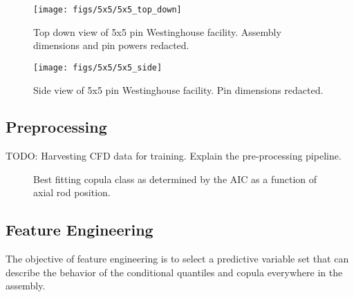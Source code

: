\begin{figure}[H]
    \centering
    \texttt{[image: figs/5x5/5x5\_top\_down]}
    \caption[Top down view of 5x5 pin Westinghouse facility.]{Top down view of 5x5 pin Westinghouse facility.  Assembly dimensions and pin powers redacted.}
    \label{fig:5x5topdown}
\end{figure}

\begin{figure}[H]
    \centering
    \texttt{[image: figs/5x5/5x5\_side]}
    \caption[Side view of 5x5 pin Westinghouse facility.]{Side view of 5x5 pin Westinghouse facility.  Pin dimensions redacted.}
    \label{fig:5x5side}
\end{figure}


\subsection{Preprocessing}

TODO: Harvesting CFD data for training. Explain the pre-processing pipeline.

\begin{figure}[H]%
    \centering
    \qquad
    \qquad
    \qquad
    \qquad
    \caption[Best fitting copula to CFD data.]{Best fitting copula class as determined by the AIC as a function of axial rod position.}%
    \label{fig:copula_predicted}%
\end{figure}


\subsection{Feature Engineering}

The objective of feature engineering is to select a predictive variable set that can describe the behavior of the conditional quantiles and copula everywhere in the assembly.   
   
